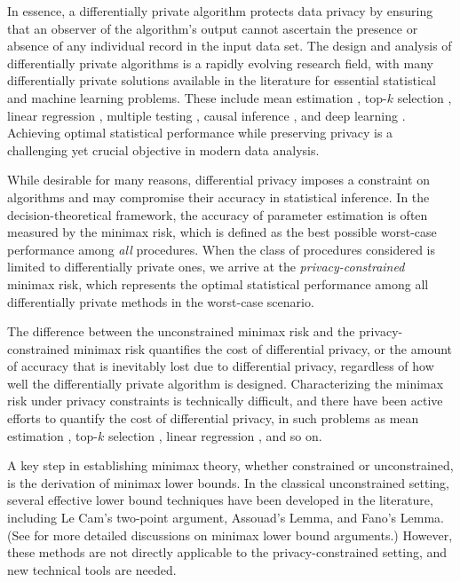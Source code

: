 \documentclass[letterpaper,12pt]{article}
\numberwithin{equation}{section}
\theoremstyle{plain}
\numberwithin{Theorem}{section}
\numberwithin{proposition}{section}
\numberwithin{Lemma}{section}
{
	\theoremstyle{definition}
	\newtheorem{Definition}{Definition}
	\newtheorem{example}{Example}
	\numberwithin{example}{section}
	\newtheorem{fact}{Fact}
	\numberwithin{fact}{section}
	\newtheorem{remark}{Remark}
}
\newcommand{\furtherrev}[1]{#1}
\newcommand{\1}{\mathbbm{1}}
\begin{document}
 In essence, a differentially private algorithm protects data privacy by ensuring that an observer of the algorithm's output cannot ascertain the presence or absence of any individual record in the input \furtherrev{data set}.
The design and analysis of differentially private algorithms is a rapidly evolving research field, with many differentially private solutions available in the literature for essential statistical and machine learning problems. These include mean estimation \cite{barber2014privacy, kamath2018privately, kamath2020private, cai2021cost}, top-$k$ selection \cite{bafna2017price, steinke2017tight}, linear regression \cite{wang2018revisiting, cai2021cost}, multiple testing \cite{dwork2018differentially}, causal inference \furtherrev{\cite{lee2019privacy}}, and deep learning \cite{abadi2016deep, phan2016differential}. Achieving optimal statistical performance while preserving privacy is a challenging yet crucial objective in modern data analysis.
 
While desirable for many reasons, differential privacy imposes a constraint on algorithms and may compromise their accuracy in statistical inference. In the decision-theoretical framework, the accuracy of parameter estimation is often measured by the minimax risk, which is defined as the best possible worst-case performance among \textit{all} procedures. When the class of procedures considered is limited to differentially private ones, we arrive at the \textit{privacy-constrained} minimax risk, which represents the optimal statistical performance among all differentially private methods in the worst-case scenario. 

The difference between the unconstrained minimax risk and the privacy-constrained minimax risk quantifies the cost of differential privacy, or the amount of accuracy that is inevitably lost due to differential privacy, regardless of how well the differentially private algorithm is designed. Characterizing the minimax risk under privacy constraints is technically difficult, and there have been active efforts to quantify the cost of differential privacy, in such problems as mean estimation \cite{barber2014privacy, kamath2018privately, kamath2020private, cai2021cost}, top-$k$ selection \cite{bafna2017price, steinke2017tight}, linear regression \cite{cai2021cost}, and so on.

A key step in establishing minimax theory, whether constrained or unconstrained, is the derivation of minimax lower bounds. In the classical unconstrained setting, several effective lower bound techniques have been developed in the literature, including Le Cam's two-point argument, Assouad's Lemma, and Fano's Lemma. (See \cite{le2012asymptotic, tsybakov2009introduction} for more detailed discussions on minimax lower bound arguments.) However, these methods are not directly applicable to the privacy-constrained setting, and new technical tools are needed. 
\end{document}
